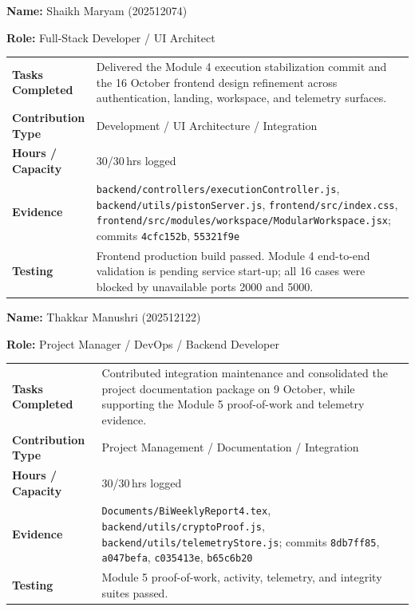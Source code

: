 \documentclass[11pt,a4paper]{article}
\newcommand{\field}[2]{\textbf{#1:} #2\par}
\begin{document}
\field{Name}{Shaikh Maryam (202512074)}
\field{Role}{Full-Stack Developer / UI Architect}
{\small
\begin{tabular}{>{\bfseries}p{} p{}}
\toprule
Tasks Completed & Delivered the Module 4 execution stabilization commit and the 16 October frontend design refinement across authentication, landing, workspace, and telemetry surfaces. \\
Contribution Type & Development / UI Architecture / Integration \\
Hours / Capacity & 30/30\,hrs logged \\
Evidence & \texttt{backend/controllers/executionController.js}, \texttt{backend/utils/pistonServer.js}, \texttt{frontend/src/index.css}, \texttt{frontend/src/modules/workspace/ModularWorkspace.jsx}; commits \texttt{4cfc152b}, \texttt{55321f9e} \\
Testing & Frontend production build passed. Module 4 end-to-end validation is pending service start-up; all 16 cases were blocked by unavailable ports 2000 and 5000. \\
\bottomrule
\end{tabular}
}

\field{Name}{Thakkar Manushri (202512122)}
\field{Role}{Project Manager / DevOps / Backend Developer}
{\small
\begin{tabular}{>{\bfseries}p{} p{}}
\toprule
Tasks Completed & Contributed integration maintenance and consolidated the project documentation package on 9 October, while supporting the Module 5 proof-of-work and telemetry evidence. \\
Contribution Type & Project Management / Documentation / Integration \\
Hours / Capacity & 30/30\,hrs logged \\
Evidence & \texttt{Documents/BiWeeklyReport4.tex}, \texttt{backend/utils/cryptoProof.js}, \texttt{backend/utils/telemetryStore.js}; commits \texttt{8db7ff85}, \texttt{a047befa}, \texttt{c035413e}, \texttt{b65c6b20} \\
Testing & Module 5 proof-of-work, activity, telemetry, and integrity suites passed. \\
\bottomrule
\end{tabular}
}
\end{document}
